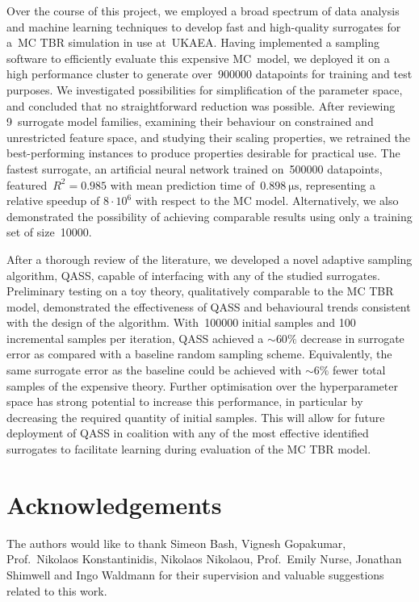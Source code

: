 Over the course of this project, we employed a broad spectrum of data
analysis and machine learning techniques to develop fast and high-quality
surrogates for a~MC TBR simulation in use at~UKAEA. Having implemented a sampling
software to efficiently evaluate this expensive MC~model, we deployed it on a
high performance cluster to generate over~\num{900000}
datapoints for training and test purposes. We
investigated possibilities for simplification of the parameter space, and
concluded that no straightforward reduction was possible. After reviewing
9~surrogate model families, examining their behaviour on constrained and
unrestricted feature space, and studying their scaling properties, we retrained
the best-performing instances to produce properties desirable for
practical use. The fastest surrogate, an artificial neural network trained
on~\num{500000} datapoints, featured~$R^2=\num{0.985}$ with mean prediction time
of~$\SI{0.898}{\micro\second}$, representing a relative
speedup of $8\cdot 10^6$ with respect to the MC model. Alternatively, we
also demonstrated the possibility of achieving comparable results using only a
training set of size~\num{10000}.

After a thorough review of the literature, we developed a novel adaptive
sampling algorithm, QASS, capable of interfacing with any of the studied
surrogates. Preliminary testing on a toy theory, qualitatively comparable to
the MC TBR model, demonstrated the effectiveness of QASS and behavioural trends
consistent with the design of the algorithm. With~\num{100000} initial samples and 100 incremental samples per iteration, QASS achieved a ${\sim}60\%$ decrease in surrogate error as compared with a baseline random sampling scheme. Equivalently, the same surrogate error as the baseline could be achieved with ${\sim}6\%$ fewer total samples of the expensive theory. Further optimisation over the hyperparameter space has strong
potential to increase this performance, in particular by decreasing the required quantity of initial samples. This will allow for future deployment of QASS
in coalition with any of the most effective identified surrogates to facilitate
learning during evaluation of the MC TBR model.


\section*{Acknowledgements}

The authors would like to thank Simeon Bash, Vignesh Gopakumar, Prof.~Nikolaos
Konstantinidis, Nikolaos Nikolaou, Prof.~Emily Nurse, Jonathan Shimwell and Ingo
Waldmann for their supervision and valuable suggestions related to this work.

